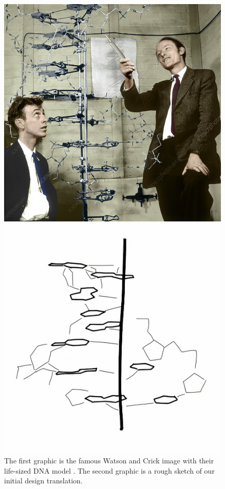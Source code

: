 \documentclass[12pt]{extarticle} %
\begin{document}
\begin{figure}[!ht]
\centering
    \begin{minipage}{.5\textwidth}
    \centering
        \includegraphics[scale=0.25]{images/screenshots/Watson and Crick.jpg}
    \end{minipage}%
    \begin{minipage}{.5\textwidth}
    \centering
         \includegraphics[scale=0.20]{images/sketches/rough_dna_structure.jpeg}
    \end{minipage}
\caption{The first graphic is the famous Watson and Crick image with their life-sized DNA model \cite{watson_and_crick}. The second graphic is a rough sketch of our initial design translation.}
\end{figure}
 
\end{document}
